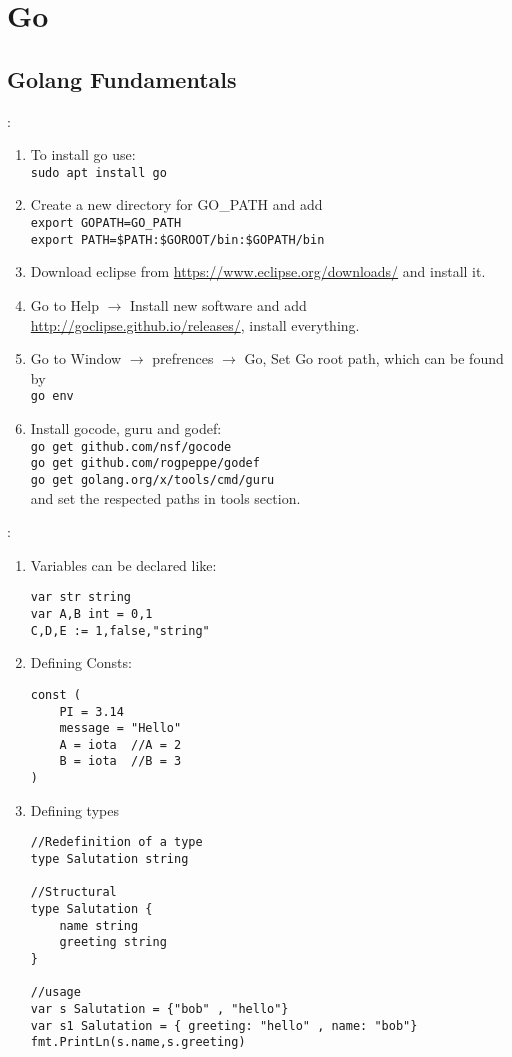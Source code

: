 \chapter{Go}
\section{Golang Fundamentals}
\begin{note}[Setup]:
	\begin{enumerate}
		\item To install go use:\\
		\verb|sudo apt install go|
		\item
		Create a new directory for GO\_PATH and add \\
		\verb|export GOPATH=GO_PATH|\\
		\verb|export PATH=$PATH:$GOROOT/bin:$GOPATH/bin|
		\item
		Download eclipse from \url{https://www.eclipse.org/downloads/} and install it.
		\item Go to Help $\rightarrow$ Install new software and add \url{http://goclipse.github.io/releases/}, install everything.
		\item Go to Window $\rightarrow$ prefrences $\rightarrow$ Go, Set Go root path, which can be found by\\
		\verb|go env|
		\item Install gocode, guru and godef:\\
		\verb|go get github.com/nsf/gocode|\\
		\verb|go get github.com/rogpeppe/godef|\\
		\verb|go get golang.org/x/tools/cmd/guru|\\
		and set the respected paths in tools section.
	\end{enumerate}
\end{note}
\begin{note}[Variables]:
	\begin{enumerate}
	\item Variables can be declared like:
\begin{lstlisting}[language = {Golang}]
var str string
var A,B int = 0,1
C,D,E := 1,false,"string"
\end{lstlisting}
	\item Defining Consts:
\begin{lstlisting}[language = {Golang}]
const (
	PI = 3.14
	message = "Hello"
	A = iota  //A = 2
	B = iota  //B = 3
)
\end{lstlisting}
	\item Defining types
\begin{lstlisting}[language = {Golang}]
//Redefinition of a type
type Salutation string

//Structural
type Salutation {
	name string
	greeting string
}

//usage
var s Salutation = {"bob" , "hello"}
var s1 Salutation = { greeting: "hello" , name: "bob"}
fmt.PrintLn(s.name,s.greeting)
\end{lstlisting}
	\end{enumerate}
\end{note}
